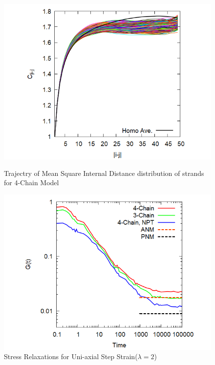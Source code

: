 \documentclass[uplatex,dvipdfmx,a4paper,11pt]{jsarticle}
\begin{document}
\begin{figure}[hb]
\begin{minipage}{0.34\hsize}
    \begin{center}
        \includegraphics[width=\textwidth]{N48_f4_CN.png}
	    \caption{Trajectry of Mean Square Internal Distance distribution of strands for 4-Chain Model}
	    \label{fig:e2e}
	\end{center}
\end{minipage}
\begin{minipage}{0.34\hsize}
	\begin{center}
		\includegraphics[width=\textwidth]{gt_comp_34.png}
        \caption{Stress Relaxations for Uni-axial Step Strain($\lambda=2$)}
        \label{fig:stress_rel}

\end{center}
\end{minipage}
\end{figure}
\end{document}
